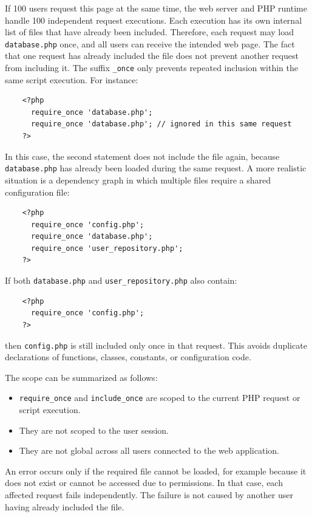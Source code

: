 \documentclass{scrbook}
\begin{document}
	If 100 users request this page at the same time, the web server and PHP runtime handle 100 independent request executions. Each execution has its own internal list of files that have already been included. Therefore, each request may load \texttt{database.php} once, and all users can receive the intended web page. The fact that one request has already included the file does not prevent another request from including it.	The suffix \texttt{\_once} only prevents repeated inclusion within the same script execution. For instance:
	
	\begin{lstlisting}
	<?php
	  require_once 'database.php';
	  require_once 'database.php'; // ignored in this same request
	?>
	\end{lstlisting}
	
	In this case, the second statement does not include the file again, because \texttt{database.php} has already been loaded during the same request. A more realistic situation is a dependency graph in which multiple files require a shared configuration file:
	
	\begin{lstlisting}
	<?php
	  require_once 'config.php';
	  require_once 'database.php';
	  require_once 'user_repository.php';
	?>
	\end{lstlisting}
	
	If both \texttt{database.php} and \texttt{user\_repository.php} also contain:
	
	\begin{lstlisting}
	<?php
	  require_once 'config.php';
	?>
	\end{lstlisting}
	
	then \texttt{config.php} is still included only once in that request. This avoids duplicate declarations of functions, classes, constants, or configuration code.
	
	The scope can be summarized as follows:
	
	\begin{itemize}
		\item \texttt{require\_once} and \texttt{include\_once} are scoped to the current PHP request or script execution.
		\item They are not scoped to the user session.
		\item They are not global across all users connected to the web application.
	\end{itemize}
	
	An error occurs only if the required file cannot be loaded, for example because it does not exist or cannot be accessed due to permissions. In that case, each affected request fails independently. The failure is not caused by another user having already included the file.
	
\end{document}
